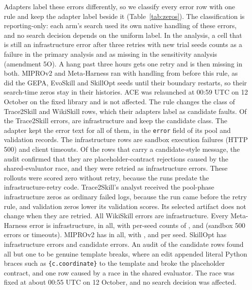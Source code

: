 Adapters label these errors differently, so we classify every error row with one rule and keep the adapter label beside it (Table~\ref{tab:zeros}).
The classification is reporting-only: each arm's search used its own native handling of these errors, and no search decision depends on the uniform label.
In the analysis, a cell that is still an infrastructure error after three retries with new trial seeds counts as a failure in the primary analysis and as missing in the sensitivity analysis (amendment 5O).
A hang past three hours gets one retry and is then missing in both.
MIPROv2 and Meta-Harness ran with handling from before this rule, as did the GEPA, EvoSkill and SkillOpt seeds until their boundary restarts, so their search-time zeros stay in their histories.
ACE was relaunched at 00:59 UTC on 12 October on the fixed library and is not affected.
The rule changes the class of Trace2Skill and WikiSkill rows, which their adapters label as candidate faults.
Of the \errTraceTotal{} Trace2Skill errors, \errTraceInfra{} are infrastructure and \errTraceCand{} keep the candidate class.
The adapter kept the error text for all of them, in the \texttt{error} field of its pool and validation records.
The infrastructure rows are sandbox execution failures (HTTP 500) and client timeouts.
Of the \errTraceCand{} rows that carry a candidate-style message, the audit confirmed that they are placeholder-contract rejections caused by the shared-evaluator race, and they were retried as infrastructure errors.
These rollouts were scored zero without retry, because the runs predate the infrastructure-retry code.
Trace2Skill's analyst received the pool-phase infrastructure zeros as ordinary failed logs, because the run came before the retry rule, and validation zeros lower its validation scores. Its selected artifact does not change when they are retried.
All \errWikiTotal{} WikiSkill errors are infrastructure.
Every Meta-Harness error is infrastructure, \errMetaTotal{} in all, with per-seed counts of \errMetaSeedZero{}, \errMetaSeedOne{} and \errMetaSeedTwo{} (sandbox 500 errors or timeouts).
MIPROv2 has \errMiproTotal{} in all, with \errMiproSeedZero{}, \errMiproSeedOne{} and \errMiproSeedTwo{} per seed.
SkillOpt has \errSkillInfra{} infrastructure errors and \errSkillCand{} candidate errors.
An audit of the candidate rows found all but one to be genuine template breaks, where an edit appended literal Python braces such as \texttt{\{c.coordinate\}} to the template and broke the placeholder contract, and one row caused by a race in the shared evaluator.
The race was fixed at about 00:55 UTC on 12 October, and no search decision was affected.
